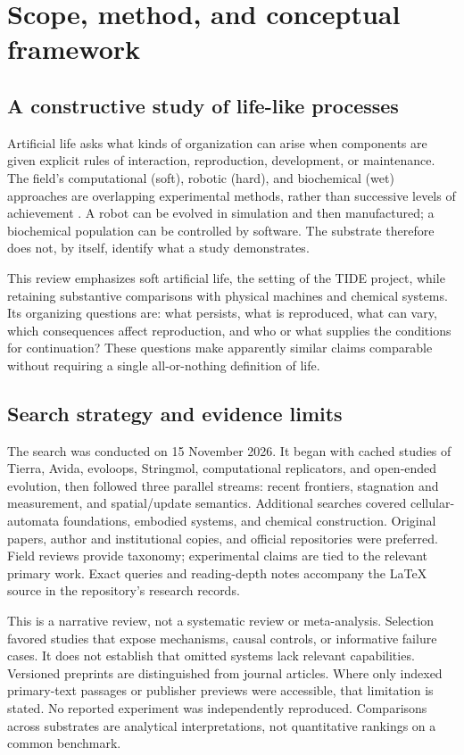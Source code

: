 \section{Scope, method, and conceptual framework}
\subsection{A constructive study of life-like processes}
Artificial life asks what kinds of organization can arise when components are
given explicit rules of interaction, reproduction, development, or maintenance.
The field's computational (soft), robotic (hard), and biochemical (wet) approaches
are overlapping experimental methods, rather than successive levels of
achievement \citep{Aguilar2014}. A robot can be evolved in simulation and then
manufactured; a biochemical population can be controlled by software. The
substrate therefore does not, by itself, identify what a study demonstrates.

This review emphasizes soft artificial life, the setting of the TIDE project,
while retaining substantive comparisons with physical machines and chemical
systems. Its organizing questions are: what persists, what is reproduced, what
can vary, which consequences affect reproduction, and who or what supplies the
conditions for continuation? These questions make apparently similar claims
comparable without requiring a single all-or-nothing definition of life.

\subsection{Search strategy and evidence limits}
The search was conducted on 15 November 2026. It began with cached studies of
Tierra, Avida, evoloops, Stringmol, computational replicators, and open-ended
evolution, then followed three parallel streams: recent frontiers, stagnation
and measurement, and spatial/update semantics. Additional searches covered
cellular-automata foundations, embodied systems, and chemical construction.
Original papers, author and institutional copies, and official repositories
were preferred. Field reviews provide taxonomy; experimental claims are tied
to the relevant primary work. Exact queries and reading-depth notes accompany
the LaTeX source in the repository's research records.

This is a narrative review, not a systematic review or meta-analysis. Selection
favored studies that expose mechanisms, causal controls, or informative failure
cases. It does not establish that omitted systems lack relevant capabilities.
Versioned preprints are distinguished from journal articles. Where only
indexed primary-text passages or publisher previews were accessible, that
limitation is stated. No reported experiment was independently reproduced.
Comparisons across substrates are analytical interpretations, not quantitative
rankings on a common benchmark.

